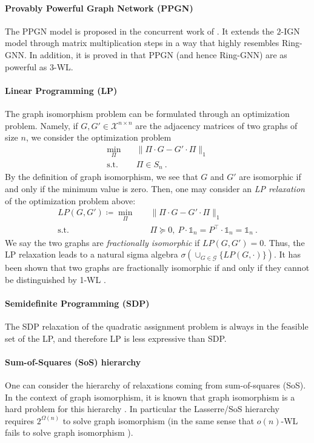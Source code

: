 \documentclass{article}
\def\Gfun{\mathcal{G}}
\begin{document}
\paragraph{Provably Powerful Graph Network (PPGN)} The PPGN model is proposed in the concurrent work of \cite{maron2019provably}. It extends the $2$-IGN model through matrix multiplication steps in a way that highly resembles Ring-GNN. In addition, it is proved in \cite{maron2019provably} that PPGN (and hence Ring-GNN) are as powerful as $3$-WL.

\paragraph{Linear Programming (LP)} The graph isomorphism problem can be formulated through an optimization problem. Namely, if $G, G' \in \mathcal{X}^{n\times n}$ are the adjacency matrices of two graphs of size $n$, we consider the optimization problem
\begin{align*}
    \min_{\Pi} & \quad \| \Pi \cdot G - G' \cdot \Pi \|_1 \\
    \text{s.t.} & \quad \Pi \in S_n~.
\end{align*}
By the definition of graph isomorphism, we see that $G$ and $G'$ are isomorphic if and only if the minimum value is zero.
Then, one may consider an \emph{LP relaxation} of the optimization problem above:
\begin{align*}
    LP(G, G') \coloneqq \min_{\Pi} & \quad \| \Pi \cdot G - G' \cdot \Pi \|_1 \\
    \text{s.t.} & \quad \Pi \succeq 0,~ P \cdot \mathds{1}_n = P^\intercal \cdot \mathds{1}_n = \mathds{1}_n~.
\end{align*}
We say the two graphs are \emph{fractionally isomorphic} if $LP(G, G') = 0$.
Thus, the LP relaxation leads to a natural sigma algebra $\sigma(\cup_{G \in \Gfun } \{LP(G, \cdot) \}).$ 
It has been shown that two graphs are fractionally isomorphic if and only if they cannot be distinguished by 1-WL \cite{tinhofer1986graph, tinhofer1991note, ramana1994fractional}. 

\paragraph{Semidefinite Programming (SDP)} 
The SDP relaxation of the quadratic assignment problem \cite{zhao1998semidefinite} is always in the feasible set of the LP, and therefore LP is less expressive than SDP.
\paragraph{Sum-of-Squares (SoS) hierarchy} One can consider the hierarchy of relaxations coming from sum-of-squares (SoS). In the context of graph isomorphism, it is known that graph isomorphism is a hard problem for this hierarchy \cite{o2014hardness}. In particular the Lasserre/SoS hierarchy requires $2^{\Omega(n)}$ to solve graph isomorphism (in the same sense that $o(n)$-WL fails to solve graph isomorphism \cite{cai1992optimal}).
\end{document}
